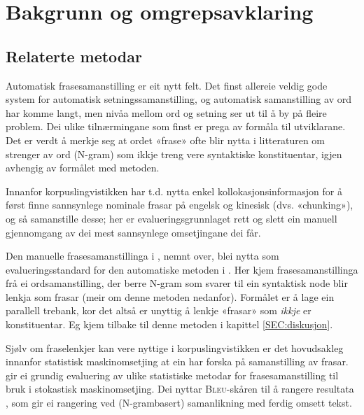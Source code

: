 \documentclass[11pt,a4paper,oneside,draft]{book}
\newcommand{\Bleu}{\textsc{Bleu}}
\begin{document}
\chapter{Bakgrunn og omgrepsavklaring}
\label{sec-2}

  \label{SEC:bakgrunn}
  
\section{Relaterte metodar}
\label{sec-2.1}

Automatisk frasesamanstilling er eit nytt felt. Det finst allereie
veldig gode system for automatisk setningssamanstilling, og automatisk
samanstilling av ord har komme langt, men nivåa mellom ord og setning
ser ut til å by på fleire problem.  Dei ulike tilnærmingane
som finst er prega av formåla til utviklarane. Det er verdt å merkje
seg at ordet «frase» ofte blir nytta i litteraturen om strenger av ord
(N-gram) som ikkje treng vere syntaktiske konstituentar, igjen
avhengig av formålet med metoden.

Innanfor korpuslingvistikken har t.d. \citet{piao2001mwu} nytta enkel
kollokasjonsinformasjon for å først finne sannsynlege nominale frasar
på engelsk og kinesisk (dvs. «chunking»), og så samanstille desse; her
er evalueringsgrunnlaget rett og slett ein manuell gjennomgang av dei
mest sannsynlege omsetjingane dei får. 

Den manuelle frasesamanstillinga i \citet{samuelsson2006pap}, nemnt
over, blei nytta som evalueringsstandard for den automatiske metoden i
\citet{samuelsson2007apa}.  Her kjem frasesamanstillinga frå ei
ordsamanstilling, der berre N-gram som svarer til ein syntaktisk node
blir lenkja som frasar (meir om denne metoden nedanfor). Formålet er å
lage ein parallell trebank, kor det altså er unyttig å lenkje «frasar»
som \emph{ikkje} er konstituentar. Eg kjem tilbake til denne metoden i
kapittel \ref{SEC:diskusjon}.

Sjølv om fraselenkjer kan vere nyttige i korpuslingvistikken er det
hovudsakleg innanfor statistisk maskinomsetjing at ein har forska på
samanstilling av frasar. \citet{koehn2003spb} gir ei grundig
evaluering av ulike statistiske metodar for frasesamanstilling til
bruk i stokastisk maskinomsetjing. Dei nyttar \Bleu-skåren til å
rangere resultata
\citep[Papineni~et~al.,~2001,~i][s.~51]{koehn2003spb}, som gir ei
rangering ved (N-grambasert) samanlikning med ferdig omsett tekst.
\end{document}
